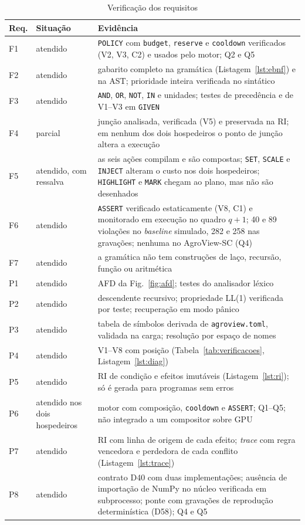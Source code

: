 \documentclass[conference]{IEEEtran}
\begin{document}
\begin{table}[t]
\caption{Verificação dos requisitos}
\label{tab:requisitos}
\centering
\scriptsize
\setlength{\tabcolsep}{3pt}
\begin{tabularx}{\textwidth}{@{}l >{\raggedright\arraybackslash}p{} L@{}}
\toprule
\textbf{Req.} & \textbf{Situação} & \textbf{Evidência} \\
\midrule
F1 & atendido & \texttt{POLICY} com \texttt{budget}, \texttt{reserve} e \texttt{cooldown} verificados (V2, V3, C2) e usados pelo motor; Q2 e Q5 \\
F2 & atendido & gabarito completo na gramática (Listagem~\ref{lst:ebnf}) e na AST; prioridade inteira verificada no sintático \\
F3 & atendido & \texttt{AND}, \texttt{OR}, \texttt{NOT}, \texttt{IN} e unidades; testes de precedência e de V1--V3 em \texttt{GIVEN} \\
F4 & parcial & junção analisada, verificada (V5) e preservada na RI; em nenhum dos dois hospedeiros o ponto de junção altera a execução \\
F5 & atendido, com ressalva & as seis ações compilam e são compostas; \texttt{SET}, \texttt{SCALE} e \texttt{INJECT} alteram o custo nos dois hospedeiros; \texttt{HIGHLIGHT} e \texttt{MARK} chegam ao plano, mas não são desenhados \\
F6 & atendido & \texttt{ASSERT} verificado estaticamente (V8, C1) e monitorado em execução no quadro $q+1$; 40 e 89 violações no \textit{baseline} simulado, 282 e 258 nas gravações; nenhuma no AgroView-SC (Q4) \\
F7 & atendido & a gramática não tem construções de laço, recursão, função ou aritmética \\
\addlinespace
P1 & atendido & AFD da Fig.~\ref{fig:afd}; testes do analisador léxico \\
P2 & atendido & descendente recursivo; propriedade LL(1) verificada por teste; recuperação em modo pânico \\
P3 & atendido & tabela de símbolos derivada de \texttt{agroview.toml}, validada na carga; resolução por espaço de nomes \\
P4 & atendido & V1--V8 com posição (Tabela~\ref{tab:verificacoes}, Listagem~\ref{lst:diag}) \\
P5 & atendido & RI de condição e efeitos imutáveis (Listagem~\ref{lst:ri}); só é gerada para programas sem erros \\
P6 & atendido nos dois hospedeiros & motor com composição, \texttt{cooldown} e \texttt{ASSERT}; Q1--Q5; não integrado a um compositor sobre GPU \\
P7 & atendido & RI com linha de origem de cada efeito; \textit{trace} com regra vencedora e perdedora de cada conflito (Listagem~\ref{lst:trace}) \\
P8 & atendido & contrato D40 com duas implementações; ausência de importação de NumPy no núcleo verificada em subprocesso; ponte com gravações de reprodução determinística (D58); Q4 e Q5 \\
\bottomrule
\end{tabularx}
\end{table}
\end{document}
